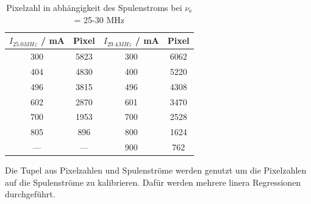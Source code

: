 \begin{table}  
  \centering
  \caption{Pixelzahl in abhängigkeit des Spulenstroms bei $\nu_\text{e}$ = 25-30 MHz}
  \begin{tabular}{c c|c c}
    \toprule
 	$I_{25.0 MHz}$ / mA & Pixel & $I_{29.4 MHz}$ / mA & Pixel \\
    \midrule
	300 & 5823 & 300 & 6062 \\
	404 & 4830 & 400 & 5220 \\
	496 & 3815 & 496 & 4308 \\
	602 & 2870 & 601 & 3470 \\
	700 & 1953 & 700 & 2528 \\
	805 & 896  & 800 & 1624 \\
	--- & ---  & 900 & 762  \\
    \bottomrule
  \end{tabular}
  \label{tab:Mess2}
\end{table}
Die Tupel aus Pixelzahlen und Spulenströme werden genutzt um die Pixelzahlen auf die Spulenströme zu kalibrieren. Dafür werden mehrere linera Regressionen durchgeführt. 
